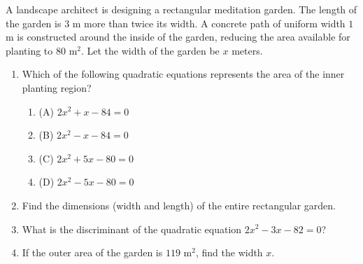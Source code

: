 \documentclass[12pt,a4paper]{exam}
\begin{document}
\begin{questions}
\question[4] A landscape architect is designing a rectangular meditation garden. The length of the garden is $3$ m more than twice its width. A concrete path of uniform width $1$ m is constructed around the inside of the garden, reducing the area available for planting to $80$ m$^2$. Let the width of the garden be $x$ meters.
\vspace{0.2cm}
\begin{enumerate}[label=(\roman*)]
  \item Which of the following quadratic equations represents the area of the inner planting region?
  \begin{enumerate}[label=(\Alph*)]
    \item (A) $2x^2 + x - 84 = 0$
    \item (B) $2x^2 - x - 84 = 0$
    \item (C) $2x^2 + 5x - 80 = 0$
    \item (D) $2x^2 - 5x - 80 = 0$
  \end{enumerate}
  \item Find the dimensions (width and length) of the entire rectangular garden.
  \item What is the discriminant of the quadratic equation $2x^2 - 3x - 82 = 0$?
  \item If the outer area of the garden is $119$ m$^2$, find the width $x$.
\end{enumerate}
\vspace{0.15cm}


\end{questions}
\end{document}
